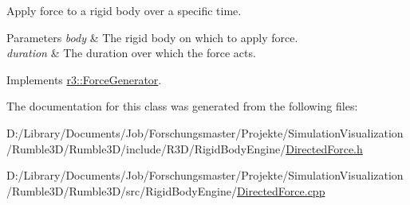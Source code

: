 Apply force to a rigid body over a specific time. 


\begin{DoxyParams}{Parameters}
{\em body} & The rigid body on which to apply force. \\
\hline
{\em duration} & The duration over which the force acts. \\
\hline
\end{DoxyParams}


Implements \mbox{\hyperlink{classr3_1_1_force_generator_a69bebbde8cef792d6636af50037af2aa}{r3\+::\+Force\+Generator}}.



The documentation for this class was generated from the following files\+:\begin{DoxyCompactItemize}
\item 
D\+:/\+Library/\+Documents/\+Job/\+Forschungsmaster/\+Projekte/\+Simulation\+Visualization/\+Rumble3\+D/\+Rumble3\+D/include/\+R3\+D/\+Rigid\+Body\+Engine/\mbox{\hyperlink{_directed_force_8h}{Directed\+Force.\+h}}\item 
D\+:/\+Library/\+Documents/\+Job/\+Forschungsmaster/\+Projekte/\+Simulation\+Visualization/\+Rumble3\+D/\+Rumble3\+D/src/\+Rigid\+Body\+Engine/\mbox{\hyperlink{_directed_force_8cpp}{Directed\+Force.\+cpp}}\end{DoxyCompactItemize}
